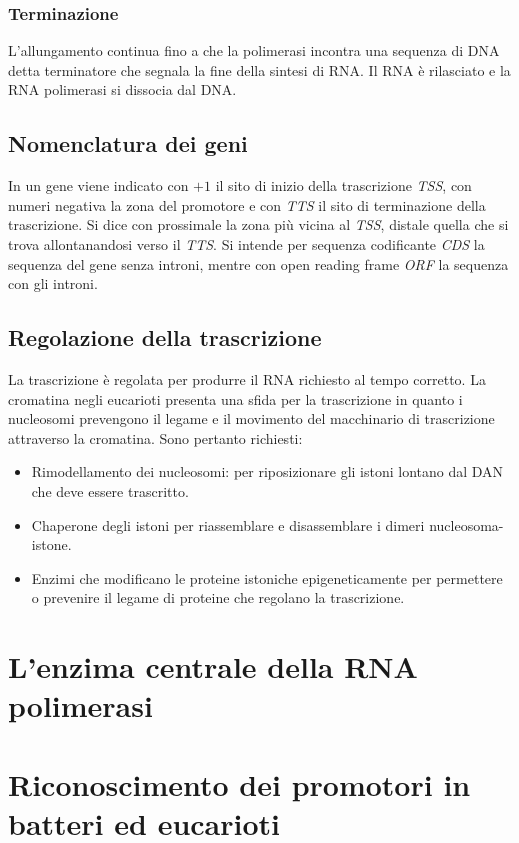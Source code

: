 \subsubsection{Terminazione}
L'allungamento continua fino a che la polimerasi incontra una sequenza di DNA detta terminatore che segnala la fine della sintesi di RNA. Il RNA \`e rilasciato e la RNA polimerasi si 
dissocia dal DNA. 
\subsection{Nomenclatura dei geni}
In un gene viene indicato con $+1$ il sito di inizio della trascrizione \emph{TSS}, con numeri negativa la zona del promotore e con \emph{TTS} il sito di terminazione della trascrizione.
Si dice con prossimale la zona pi\`u vicina al \emph{TSS}, distale quella che si trova allontanandosi verso il \emph{TTS}. Si intende per sequenza codificante \emph{CDS} la sequenza del 
gene senza introni, mentre con open reading frame \emph{ORF} la sequenza con gli introni. 
\subsection{Regolazione della trascrizione}
La trascrizione \`e regolata per produrre il RNA richiesto al tempo corretto. La cromatina negli eucarioti presenta una sfida per la trascrizione in quanto i nucleosomi prevengono
il legame e il movimento del macchinario di trascrizione attraverso la cromatina. Sono pertanto richiesti:
\begin{itemize}
	\item Rimodellamento dei nucleosomi: per riposizionare gli istoni lontano dal DAN che deve essere trascritto. 
	\item Chaperone degli istoni per riassemblare e disassemblare i dimeri nucleosoma-istone.
	\item Enzimi che modificano le proteine istoniche epigeneticamente per permettere o prevenire il legame di proteine che regolano la trascrizione.
\end{itemize}
\section{L'enzima centrale della RNA polimerasi}

\section{Riconoscimento dei promotori in batteri ed eucarioti}

